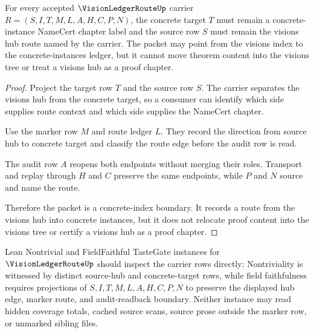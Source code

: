 \begin{theorem}
\label{thm:vision-ledger-route-concrete-index-boundary}
For every accepted $\VisionLedgerRouteUp$ carrier $R=(S,I,T,M,L,A,H,C,P,N)$, the concrete target $T$ must remain a concrete-instance NameCert chapter label and the source row $S$ must remain the visions hub route named by the carrier. The packet may point from the visions index to the concrete-instances ledger, but it cannot move theorem content into the visions tree or treat a visions hub as a proof chapter.
\end{theorem}
\begin{proof}
Project the target row $T$ and the source row $S$. The carrier separates the visions hub from the concrete target, so a consumer can identify which side supplies route context and which side supplies the NameCert chapter.

Use the marker row $M$ and route ledger $L$. They record the direction from source hub to concrete target and classify the route edge before the audit row is read.

The audit row $A$ reopens both endpoints without merging their roles. Transport and replay through $H$ and $C$ preserve the same endpoints, while $P$ and $N$ source and name the route.

Therefore the packet is a concrete-index boundary. It records a route from the visions hub into concrete instances, but it does not relocate proof content into the visions tree or certify a visions hub as a proof chapter.
\end{proof}



Lean Nontrivial and FieldFaithful TasteGate instances for $\VisionLedgerRouteUp$ should inspect the carrier rows directly: Nontriviality is witnessed by distinct source-hub and concrete-target rows, while field faithfulness requires projections of $S,I,T,M,L,A,H,C,P,N$ to preserve the displayed hub edge, marker route, and audit-readback boundary. Neither instance may read hidden coverage totals, cached source scans, source prose outside the marker row, or unmarked sibling files.

